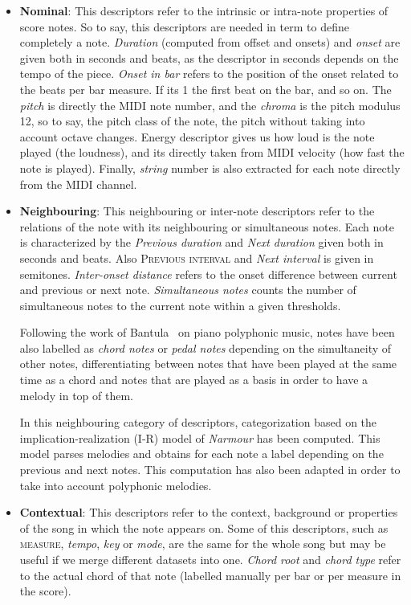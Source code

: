 

\begin{itemize}
\item \textbf{Nominal}: This descriptors refer to the intrinsic or intra-note properties of score notes. So to say, this descriptors are needed in term to define completely a note. \textit{Duration} (computed from offset and onsets) and \textit{onset} are given both in seconds and beats, as the descriptor in seconds depends on the tempo of the piece. \textit{Onset in bar} refers to the position of the onset related to the beats per bar measure. If its 1 the first beat on the bar, and so on. The \textit{pitch} is directly the MIDI note number, and the \textit{chroma} is the pitch modulus 12, so to say, the pitch class of the note, the pitch without taking into account octave changes. Energy descriptor gives us how loud is the note played (the loudness), and its directly taken from MIDI velocity (how fast the note is played). Finally, \textit{string} number is also extracted for each note directly from the MIDI channel.

\item \textbf{Neighbouring}: This neighbouring or inter-note descriptors refer to the relations of the note with its neighbouring or simultaneous notes. Each note is characterized by the \textit{Previous duration} and \textit{Next duration} given both in seconds and beats. Also \textsc{Previous interval} and \textit{Next interval} is given in semitones. \textit{Inter-onset distance} refers to the onset difference between current and previous or next note. \textit{Simultaneous notes} counts the number of simultaneous notes to the current note within a given thresholds.

Following the work of Bantula~\cite{bantula2016} on piano polyphonic music, notes have been also labelled as \textit{chord notes} or \textit{pedal notes} depending on the simultaneity of other notes, differentiating between notes that have been played at the same time as a chord and notes that are played as a basis in order to have a melody in top of them.

In this neighbouring category of descriptors, categorization based on the implication-realization (I-R) model of \textit{Narmour} has been computed.  This model parses melodies and obtains for each note a label depending on the previous and next notes. This computation has also been adapted in order to take into account polyphonic melodies. 

\item \textbf{Contextual}: This descriptors refer to the context, background or properties of the song in which the note appears on. Some of this descriptors, such as \textsc{measure}, \textit{tempo}, \textit{key} or \textit{mode}, are the same for the whole song but may be useful if we merge different datasets into one. \textit{Chord root} and \textit{chord type} refer to the actual chord of that note (labelled manually per bar or per measure in the score).


\end{itemize}
